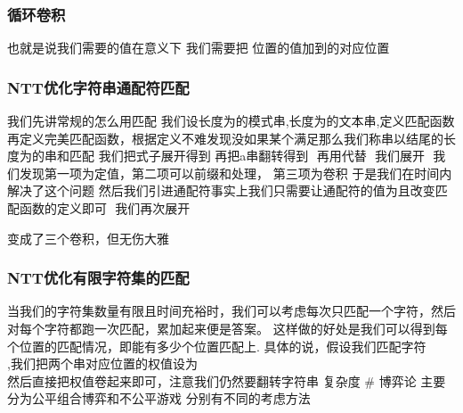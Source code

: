 \documentclass[8pt,a4paper]{article}
\newcommand{\code}[1]{
    
}
\newcommand{\txt}[1]{\par\noindent\footnotesize #1}
\newcommand{\inlineformula}[1]{\ensuremath{}}
\newcommand{\displayformula}[1]{%
    \vspace{0.2em}
    \[
        
    \]
}
\begin{document}
\begin{multicols}{2}
        \subsubsection{循环卷积}
            \txt{也就是说我们需要的值在\inlineformula{./assets/formulas_tex/formula_465.tex}意义下 我们需要把 \inlineformula{./assets/formulas_tex/formula_466.tex}位置的值加到\inlineformula{./assets/formulas_tex/formula_467.tex}的对应位置}
        \subsubsection{NTT优化字符串通配符匹配}
            \txt{我们先讲常规的\inlineformula{./assets/formulas_tex/formula_468.tex}怎么用\inlineformula{./assets/formulas_tex/formula_469.tex}匹配
我们设长度为\inlineformula{./assets/formulas_tex/formula_470.tex}的模式串\inlineformula{./assets/formulas_tex/formula_471.tex},长度为\inlineformula{./assets/formulas_tex/formula_472.tex}的文本串\inlineformula{./assets/formulas_tex/formula_473.tex},定义匹配函数\inlineformula{./assets/formulas_tex/formula_474.tex}
再定义完美匹配函数\inlineformula{./assets/formulas_tex/formula_475.tex}，根据定义不难发现没如果某个\inlineformula{./assets/formulas_tex/formula_476.tex}满足\inlineformula{./assets/formulas_tex/formula_477.tex}那么我们称\inlineformula{./assets/formulas_tex/formula_478.tex}串以\inlineformula{./assets/formulas_tex/formula_479.tex}结尾的长度为\inlineformula{./assets/formulas_tex/formula_480.tex}的串和\inlineformula{./assets/formulas_tex/formula_481.tex}匹配
我们把式子展开得到\inlineformula{./assets/formulas_tex/formula_482.tex}
再把a串翻转得到
\inlineformula{./assets/formulas_tex/formula_483.tex}
再用\inlineformula{./assets/formulas_tex/formula_484.tex}代替\inlineformula{./assets/formulas_tex/formula_485.tex}
\inlineformula{./assets/formulas_tex/formula_486.tex}
我们展开
\inlineformula{./assets/formulas_tex/formula_487.tex}
我们发现第一项为定值，第二项可以前缀和处理，
第三项为卷积 于是我们在\inlineformula{./assets/formulas_tex/formula_488.tex}时间内解决了这个问题
然后我们引进通配符\inlineformula{./assets/formulas_tex/formula_489.tex}事实上我们只需要让通配符的值为\inlineformula{./assets/formulas_tex/formula_490.tex}且改变匹配函数的定义即可
\inlineformula{./assets/formulas_tex/formula_491.tex}
我们再次展开
\displayformula{./assets/formulas_tex/formula_492.tex}
变成了三个卷积，但无伤大雅}
            \code{src/number_theory/随机化算法_8_5.cpp}
        \subsubsection{NTT优化有限字符集的匹配}
            \txt{当我们的字符集数量有限且时间充裕时，我们可以考虑每次只匹配一个字符，然后对每个字符都跑一次匹配，累加起来便是答案。
这样做的好处是我们可以得到每个位置的匹配情况，即能有多少个位置匹配上.
具体的说，假设我们匹配字符\displayformula{./assets/formulas_tex/formula_493.tex},我们把两个串对应位置的权值设为\displayformula{./assets/formulas_tex/formula_494.tex}然后直接把权值卷起来即可，注意我们仍然要翻转字符串\inlineformula{./assets/formulas_tex/formula_495.tex}
复杂度\inlineformula{./assets/formulas_tex/formula_496.tex}
\# 博弈论
主要分为公平组合博弈和不公平游戏
分别有不同的考虑方法}

\end{multicols}
\end{document}
